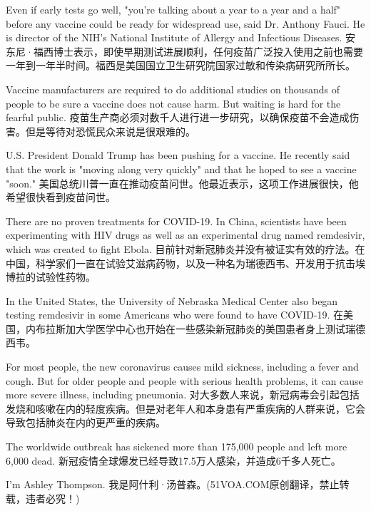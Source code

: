 Even if early tests go well, "you're talking about a year to a year and a half" before any vaccine could be ready for widespread use, said Dr. Anthony Fauci. He is director of the NIH's National Institute of Allergy and Infectious Diseases.
安东尼·福西博士表示，即使早期测试进展顺利，任何疫苗广泛投入使用之前也需要一年到一年半时间。福西是美国国立卫生研究院国家过敏和传染病研究所所长。

Vaccine manufacturers are required to do additional studies on thousands of people to be sure a vaccine does not cause harm. But waiting is hard for the fearful public.
疫苗生产商必须对数千人进行进一步研究，以确保疫苗不会造成伤害。但是等待对恐慌民众来说是很艰难的。

U.S. President Donald Trump has been pushing for a vaccine. He recently said that the work is "moving along very quickly" and that he hoped to see a vaccine "soon."
美国总统川普一直在推动疫苗问世。他最近表示，这项工作进展很快，他希望很快看到疫苗问世。

There are no proven treatments for COVID-19. In China, scientists have been experimenting with HIV drugs as well as an experimental drug named remdesivir, which was created to fight Ebola.
目前针对新冠肺炎并没有被证实有效的疗法。在中国，科学家们一直在试验艾滋病药物，以及一种名为瑞德西韦、开发用于抗击埃博拉的试验性药物。

In the United States, the University of Nebraska Medical Center also began testing remdesivir in some Americans who were found to have COVID-19.
在美国，内布拉斯加大学医学中心也开始在一些感染新冠肺炎的美国患者身上测试瑞德西韦。

For most people, the new coronavirus causes mild sickness, including a fever and cough. But for older people and people with serious health problems, it can cause more severe illness, including pneumonia.
对大多数人来说，新冠病毒会引起包括发烧和咳嗽在内的轻度疾病。但是对老年人和本身患有严重疾病的人群来说，它会导致包括肺炎在内的更严重的疾病。

The worldwide outbreak has sickened more than 175,000 people and left more 6,000 dead.
新冠疫情全球爆发已经导致17.5万人感染，并造成6千多人死亡。

I'm Ashley Thompson.
我是阿什利·汤普森。(51VOA.COM原创翻译，禁止转载，违者必究！)